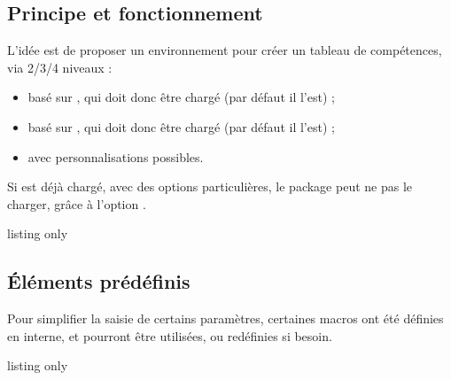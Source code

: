 \documentclass[french,11pt,a4paper]{article}
\begin{document}
\subsection{Principe et fonctionnement}

L'idée est de proposer un environnement pour créer un tableau de compétences, via 2/3/4 niveaux :

\begin{itemize}
	\item basé sur , qui doit donc être chargé (par défaut il l'est) ;
	\item basé sur , qui doit donc être chargé (par défaut il l'est) ;
	\item avec personnalisations possibles.
\end{itemize}

Si  est déjà chargé, avec des options particulières, le package peut ne pas le charger, grâce à l'option .

\begin{DemoCode}{listing only}
\end{DemoCode}

\begin{DemoCode}{}
\end{DemoCode}

\subsection{Éléments prédéfinis}

Pour simplifier la saisie de certains paramètres, certaines macros ont été définies en interne, et pourront être utilisées, ou redéfinies si besoin.

\begin{DemoCode}{listing only}
\def\LabelNoteComp{Note}
\def\LstDeuxNiv{NA § A}
\def\LstTroisNiv{NA § ECA § A}
\def\LstQuatreNiv{NA § PA § ECA § A}
\def\NoticeDeuxNiv{Non acquis § Acquis}
\def\NoticeTroisNiv{Non acquis § En cours d'acquis. § Acquis}
\def\NoticeQuatreNiv{Non acquis § Part. acquis § En cours d'acquis. § Acquis}
\end{DemoCode}
\end{document}
